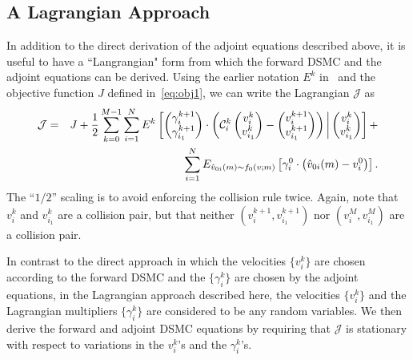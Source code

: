 \documentclass[12pt,nopreprintline]{elsarticle}
\newcommand{\cC}{\mathcal C} \newcommand{\cD}{\mathcal D}
\begin{document}



\subsection{A Lagrangian Approach}\label{subsec:Lagrangian}
In addition to the direct derivation of the adjoint equations described above, it is useful to have a ``Langrangian" form from which the forward DSMC and the adjoint equations can be derived. 
Using the earlier notation $E^k$ in~ and the objective function $J$ defined in~\eqref{eq:obj1}, we can write the Lagrangian $\mathcal J$ as 
\begin{eqnarray}
\cJ &= &  J + \frac{1}{2}\sum_{k=0}^{M-1} \sum_{i=1}^N E^k \left[   \begin{pmatrix} \gamma_i^{k+1} \\ \gamma_{i_1}^{k+1} \end{pmatrix} \cdot  \left( \cC_{i}^k \begin{pmatrix} v_i^k \\ v_{i_1}^k \end{pmatrix} - \begin{pmatrix} v_i^{k+1} \\ v_{i_1}^{k+1} \end{pmatrix} \right)   \bigg| \begin{pmatrix} v_i^k \\ v_{i_1}^k \end{pmatrix} \right] +  \nonumber \\
&&   \sum_{i=1}^N E_{\hat{v}_{0i} (m) \sim f_0(v;m)} \left[  \gamma_{i}^0 \cdot  \left( \hat{v}_{0i} (m) - v_i^0 \right) \right]. \label{eq:full_Lag}
\end{eqnarray}
The ``$1/2$'' scaling is to avoid enforcing the collision rule twice. Again, note that $v_i^{k}$ and $v_{i_1}^{k}$ are a collision pair, but that neither $(v_i^{k+1}, v_{i_1}^{k+1})$ nor $(v_i^{M}, v_{i_1}^{M})$  are a collision pair.


In contrast to the direct approach in which the velocities $\{v_i^k\}$ are chosen according to the forward DSMC and the $\{\gamma_i^{k}\}$ are chosen by the adjoint equations, in the Lagrangian approach described here, the velocities $\{v_i^k\}$ and the Lagrangian multipliers $\{\gamma_i^{k}\}$ are considered to be any random variables. We then derive the forward and adjoint DSMC equations by requiring that $\mathcal J$ is stationary with respect to variations in the  $v_i^k$'s and the $\gamma_i^{k}$'s.
\end{document}
